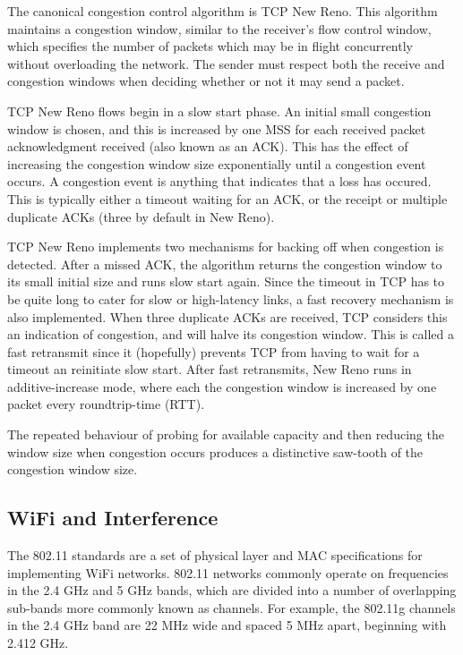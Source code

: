 The canonical congestion control algorithm is TCP New Reno. This algorithm
maintains a congestion window, similar to the receiver's flow control window,
which specifies the number of packets which may be in flight concurrently
without overloading the network. The sender must respect both the receive and
congestion windows when deciding whether or not it may send a packet.

TCP New Reno flows begin in a slow start phase. An initial small congestion
window is chosen, and this is increased by one MSS for each received packet
acknowledgment received (also known as an ACK). This has the effect of
increasing the congestion window size exponentially until a congestion event
occurs. A congestion event is anything that indicates that a loss has occured.
This is typically either a timeout waiting for an ACK, or the receipt or
multiple duplicate ACKs (three by default in New Reno).

TCP New Reno implements two mechanisms for backing off when congestion is
detected. After a missed ACK, the algorithm returns the congestion window to its
small initial size and runs slow start again. Since the timeout in TCP has to be
quite long to cater for slow or high-latency links, a fast recovery mechanism is
also implemented. When three duplicate ACKs are received, TCP considers this an
indication of congestion, and will halve its congestion window. This is called a
fast retransmit since it (hopefully) prevents TCP from having to wait for a
timeout an reinitiate slow start. After fast retransmits, New Reno runs in
additive-increase mode, where each the congestion window is increased by one
packet every roundtrip-time (RTT).

The repeated behaviour of probing for available capacity and then reducing the
window size when congestion occurs produces a distinctive saw-tooth of the
congestion window size.

\subsection{WiFi and Interference}

The 802.11 standards are a set of physical layer and MAC specifications for
implementing WiFi networks. 802.11 networks commonly operate on frequencies in
the 2.4 GHz and 5 GHz bands, which are divided into a number of overlapping
sub-bands more commonly known as channels. For example, the 802.11g channels in
the 2.4 GHz band are 22 MHz wide and spaced 5 MHz apart, beginning with 2.412
GHz.

